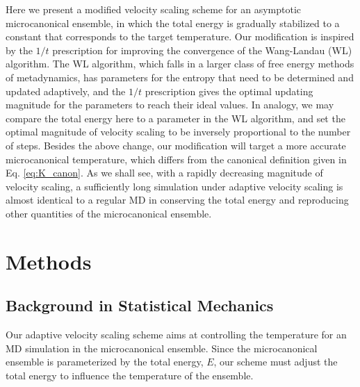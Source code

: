 \documentclass[preprint]{revtex4-1}
\begin{document}
Here we present a modified velocity scaling scheme
for an asymptotic microcanonical ensemble,
in which
the total energy is gradually stabilized to a constant
that corresponds to the target temperature.
%
Our modification is inspired by the $1/t$ prescription\cite{
  belardinelli2007, belardinelli2007jcp, belardinelli2008,
  zhou2005, zhou2008, morozov2007}
for improving the convergence of
the Wang-Landau (WL) algorithm\cite{
  wang2001, wang2001pre}.
%
The WL algorithm,
which falls in a larger class of free energy methods
of metadynamics\cite{
  laio2002, laio2008, marsili2006},
has parameters for the entropy that need to be
determined and updated adaptively,
and the $1/t$ prescription gives the optimal updating magnitude
for the parameters to reach their ideal values.
%
In analogy, we may compare the total energy here
to a parameter in the WL algorithm,
and set the optimal magnitude
of velocity scaling to be inversely proportional
to the number of steps.
%
Besides the above change,
our modification will target a more accurate
microcanonical temperature\cite{rugh1997},
which differs from the canonical definition
given in Eq. \eqref{eq:K_canon}.
%
As we shall see,
with a rapidly decreasing magnitude of velocity scaling,
a sufficiently long simulation under adaptive velocity scaling
is almost identical to a regular MD
in conserving the total energy and reproducing other quantities
of the microcanonical ensemble.



\section{Methods}



\subsection{Background in Statistical Mechanics}



Our adaptive velocity scaling scheme aims at
controlling the temperature for an
MD simulation in the microcanonical ensemble.
%
Since the microcanonical ensemble is parameterized by
the total energy, $E$,
our scheme must adjust the total energy
to influence the temperature of the ensemble.
\end{document}

